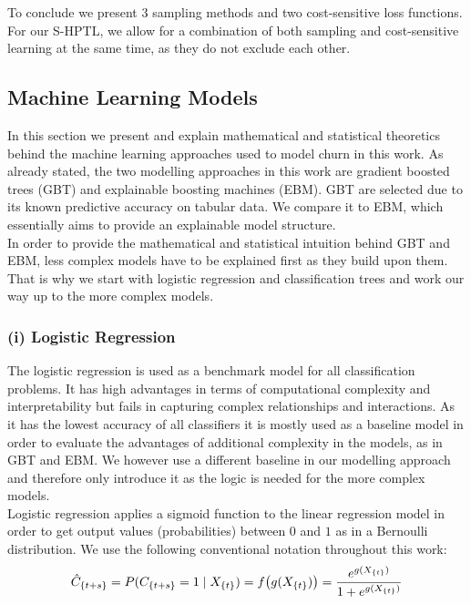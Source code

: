 \documentclass[12pt,titlepage]{article}
\begin{document}
\noindent
To conclude we present 3 sampling methods and two cost-sensitive loss functions. For our S-HPTL, we allow for a combination of both sampling and cost-sensitive learning at the same time, as they do not exclude each other. \\


\subsection{Machine Learning Models} \par
\label{chap:mlmodels}

In this section we present and explain mathematical and statistical theoretics behind the machine learning approaches used to model churn in this work. As already stated, the two modelling approaches in this work are gradient boosted trees (GBT) and explainable boosting machines (EBM). GBT are selected due to its known predictive accuracy on tabular data. We compare it to EBM, which essentially aims to provide an explainable model structure. \\
In order to provide the mathematical and statistical intuition behind GBT and EBM, less complex models have to be explained first as they build upon them. That is why we start with logistic regression and classification trees and work our way up to the more complex models. \\

\subsubsection*{(i) Logistic Regression}
The logistic regression is used as a benchmark model for all classification problems. It has high advantages in terms of computational complexity and interpretability but fails in capturing complex relationships and interactions. As it has the lowest accuracy of all classifiers it is mostly used as a baseline model in order to evaluate the advantages of additional complexity in the models, as in GBT and EBM. We however use a different baseline in our modelling approach and therefore only introduce it as the logic is needed for the more complex models.\\
Logistic regression applies a sigmoid function to the linear regression model in order to get output values (probabilities) between $0$ and $1$ as in a Bernoulli distribution. We use the following conventional notation throughout this work:
\vspace{5mm}
\noindent
\begin{equation} \label{bern_dist}
    \hat{C}_{\{t+s\}} = P(C_{\{t+s\}}=1\mid X_{\{t\}}) = f\big(g(X_{\{t\}})\big) = \frac{e^{g(X_{\{t\}})}}{1 + e^{g(X_{\{t\}})}} \\
\end{equation}
\vspace{1mm}
\end{document}

